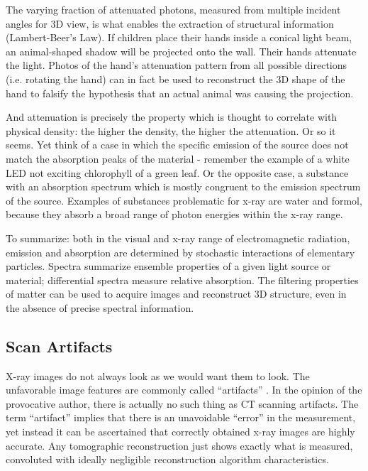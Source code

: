 The varying fraction of attenuated photons, measured from multiple incident angles for 3D view, is what enables the extraction of structural information (Lambert-Beer's Law).
If children place their hands inside a conical light beam, an animal-shaped shadow will be projected onto the wall.
Their hands attenuate the light.
Photos of the hand's attenuation pattern from all possible directions (i.e. rotating the hand) can in fact be used to reconstruct the 3D shape of the hand to falsify the hypothesis that an actual animal was causing the projection.

And attenuation is precisely the property which is thought to correlate with physical density: the higher the density, the higher the attenuation.
Or so it seems.
Yet think of a case in which the specific emission of the source does not match the absorption peaks of the material - remember the example of a white LED not exciting chlorophyll of a green leaf.
Or the opposite case, a substance with an absorption spectrum which is mostly congruent to the emission spectrum of the source.
Examples of substances problematic for x-ray are water and formol, because they absorb a broad range of photon energies within the x-ray range.


To summarize: both in the visual and x-ray range of electromagnetic radiation, emission and absorption are determined by stochastic interactions of elementary particles.
Spectra summarize ensemble properties of a given light source or material; differential spectra measure relative absorption.
The filtering properties of matter can be used to acquire images and reconstruct 3D structure, even in the absence of precise spectral information.


\subsection{Scan Artifacts}
\label{sec:orgc3c421b}
X-ray images do not always look as we would want them to look.
The unfavorable image features are commonly called ``artifacts'' \citep{Triche2019}.
In the opinion of the provocative author, there is actually no such thing as CT scanning artifacts.
The term ``artifact'' implies that there is an unavoidable ``error'' in the measurement, yet instead it can be ascertained that correctly obtained x-ray images are highly accurate.
Any tomographic reconstruction just shows exactly what is measured, convoluted with ideally negligible reconstruction algorithm characteristics.


